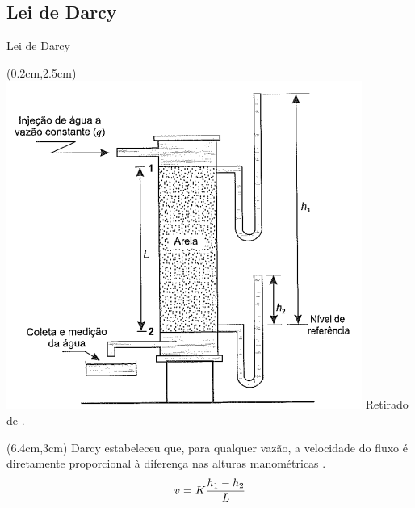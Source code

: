\documentclass[professionalfont]{beamer}
\begin{document}
\subsection{Lei de Darcy}
\begin{frame}{Lei de Darcy}

\begin{textblock*}{.5\paperwidth}(0.2cm,2.5cm)
    \centering
    \includegraphics[scale=0.4]{./imgs/im1.png}
    \footnotesize Retirado de \cite{Rosa2006}.
\end{textblock*}

\begin{textblock*}{.48\paperwidth}(6.4cm,3cm)
    Darcy estabeleceu que, para qualquer vazão, a velocidade do fluxo é diretamente proporcional à diferença nas alturas manométricas \cite{044441830X}.
    \begin{equation}
        v = K \dfrac{h_{1} - h_{2}}{L}
    \end{equation}
    
    
\end{textblock*}

\end{frame}
\end{document}
